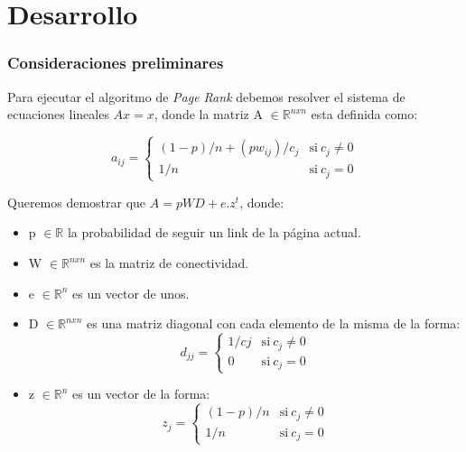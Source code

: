 \section{Desarrollo}

\subsubsection{Consideraciones preliminares} %

Para ejecutar el algoritmo de \emph{Page Rank} debemos resolver el sistema de ecuaciones lineales $A x = x$, donde la matriz A $\in \mathbb{R}^{nxn}$ esta definida como:

\begin{equation}
    a_{ij} = \left\{
            \begin{array}{ll}
                 (1-p)/n + (pw_{ij})/c_j      & \mathrm{si\ } c_j \neq 0 \\
                 1/n & \mathrm{si\ } c_j = 0
            \end{array}
        \right.
\end{equation}

Queremos demostrar que $A = pWD + e.z^t$, donde:  
\begin{itemize}
	\item p $\in \mathbb{R}$ la probabilidad de seguir un link de la página actual.  
	\item W $\in \mathbb{R}^{nxn}$ es la matriz de conectividad.  
	\item  e $\in \mathbb{R}^{n}$ es un vector de unos.
    \item D $\in \mathbb{R}^{nxn}$ es una matriz diagonal con cada elemento de la misma de la forma:     
    \begin{equation}
    	\label{defd}
        d_{jj} = \left\{
                \begin{array}{ll}
                     1/cj & \mathrm{si\ } c_j \neq 0 \\
                     0    & \mathrm{si\ } c_j = 0
                \end{array}
            \right.
    \end{equation}
    \item z $\in \mathbb{R}^{n}$ es un vector de la forma:  
    \begin{equation}
    	\label{defz}
        z_{j} = \left\{
                \begin{array}{ll}
                     (1-p)/n      & \mathrm{si\ } c_j \neq 0 \\
                     1/n & \mathrm{si\ } c_j = 0
                \end{array}
            \right.
    \end{equation}
\end{itemize}

